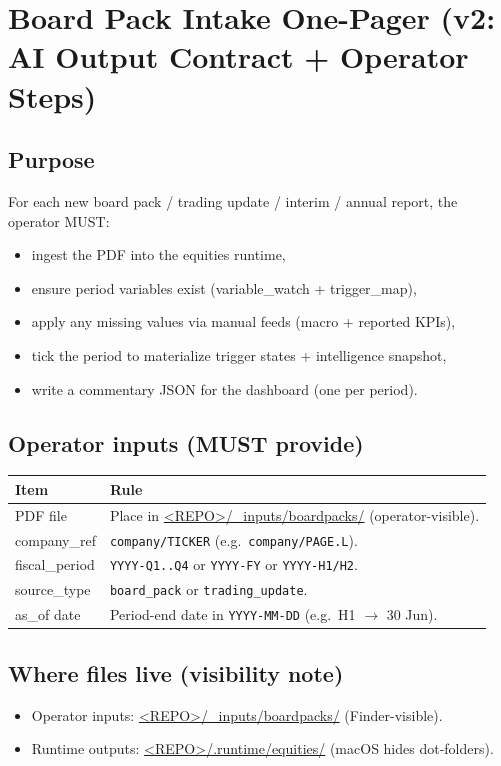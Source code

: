 \section{Board Pack Intake One-Pager (v2: AI Output Contract + Operator Steps)}
\label{sec:boardpack-onepager-v2}

\subsection*{Purpose}
For each new board pack / trading update / interim / annual report, the operator MUST:
\begin{itemize}
  \item ingest the PDF into the equities runtime,
  \item ensure period variables exist (variable\_watch + trigger\_map),
  \item apply any missing values via manual feeds (macro + reported KPIs),
  \item tick the period to materialize trigger states + intelligence snapshot,
  \item write a commentary JSON for the dashboard (one per period).
\end{itemize}

\subsection*{Operator inputs (MUST provide)}
\begin{tabularx}{\textwidth}{@{}lY@{}}
\textbf{Item} & \textbf{Rule} \\
\hline
PDF file & Place in \url{<REPO>/_inputs/boardpacks/} (operator-visible). \\
company\_ref & \texttt{company/TICKER} (e.g.\ \texttt{company/PAGE.L}). \\
fiscal\_period & \texttt{YYYY-Q1..Q4} or \texttt{YYYY-FY} or \texttt{YYYY-H1/H2}. \\
source\_type & \texttt{board\_pack} or \texttt{trading\_update}. \\
as\_of date & Period-end date in \texttt{YYYY-MM-DD} (e.g.\ H1 $\rightarrow$ 30 Jun). \\
\end{tabularx}

\subsection*{Where files live (visibility note)}
\begin{itemize}
  \item Operator inputs: \url{<REPO>/_inputs/boardpacks/} (Finder-visible).
  \item Runtime outputs: \url{<REPO>/.runtime/equities/} (macOS hides dot-folders).
\end{itemize}

